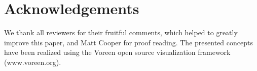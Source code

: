 \documentclass{vgtc}                          %
\begin{document}
\section*{Acknowledgements}We thank all reviewers for their fruitful comments, which helped to greatly improve this paper, and Matt Cooper for proof reading. The presented concepts have been realized using the Voreen open source visualization framework (www.voreen.org).






\end{document}
